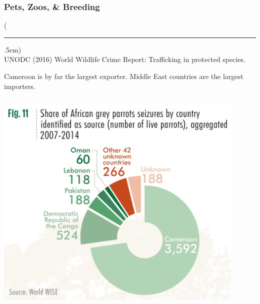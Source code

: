 \documentclass[10pt]{beamer}
\newenvironment{reference}[2]{%
	\begin{textblock*}{\textwidth}(#1,#2)
		\tiny\bgroup\color{gray}}{\egroup\end{textblock*}}
\begin{document}
\begin{frame}[t]
\frametitle{Pets, Zoos, \& Breeding}
\vspace{0.5cm}

	\begin{reference}{4mm}{92mm}
		\rule{1.5cm}{0.25pt}\\
		UNODC (2016) World Wildlife Crime Report: Trafficking in protected species.
	\end{reference}
	
	Cameroon is by far the largest \textcolor{myblue}{exporter}. Middle East countries are the largest \textcolor{myblue}{importers}. 
	
	\vspace{0.25cm}
	
		\begin{columns}
			\begin{column}{0.5\textwidth}
				\begin{center}
					\includegraphics[width=0.9\textwidth]{figures/parrot_illegal_export.png}
				\end{center}
			\end{column}
			

\end{columns}
\end{frame}
\end{document}
